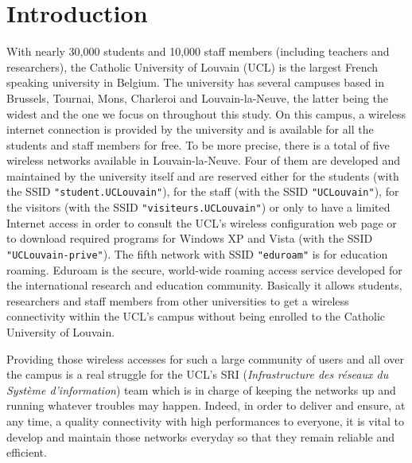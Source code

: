 
\chapter{Introduction} %

\label{Chapter1} %


With nearly 30,000 students and 10,000 staff members (including teachers and researchers), the Catholic University of Louvain (UCL) is the largest French speaking university in Belgium. The university has several campuses based in Brussels, Tournai, Mons, Charleroi and Louvain-la-Neuve, the latter being the widest and the one we focus on throughout this study. On this campus, a wireless internet connection is provided by the university and is available for all the students and staff members for free. To be more precise, there is a total of five wireless networks available in Louvain-la-Neuve. Four of them are developed and maintained by the university itself and are reserved either for the students (with the SSID \texttt{"student.UCLouvain"}), for the staff (with the SSID \texttt{"UCLouvain"}), for the visitors (with the SSID \texttt{"visiteurs.UCLouvain"}) or only to have a limited Internet access in order to consult the UCL's wireless configuration web page or to download required programs  for Windows XP and Vista (with the SSID \texttt{"UCLouvain-prive"}). The fifth network with SSID \texttt{"eduroam"} is for education roaming. Eduroam is the secure, world-wide roaming access service developed for the international research and education community\cite{eduroam1}. Basically it allows students, researchers and staff members from other universities to get a wireless connectivity within the UCL's campus without being enrolled to the Catholic University of Louvain.

Providing those wireless accesses for such a large community of users and all over the campus is a real struggle for the UCL's SRI (\textit{Infrastructure des réseaux du Système d'information}) team which is in charge of keeping the networks up and running whatever troubles may happen. Indeed, in order to deliver and ensure, at any time, a quality connectivity with high performances to everyone, it is vital to develop and maintain those networks everyday so that they remain reliable and efficient.
 
